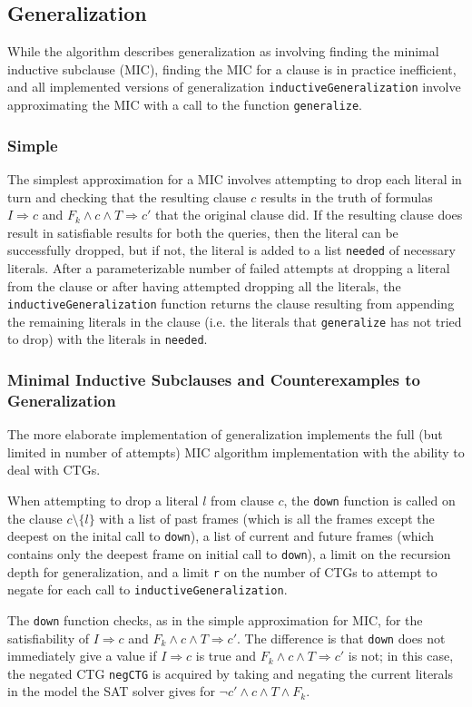 \documentclass[12pt,a4paper,twoside,openright]{report}
\begin{document}
{\subsection{Generalization}
While the algorithm describes generalization as involving finding the minimal inductive subclause (MIC),
finding the MIC for a clause is in practice inefficient, and all implemented versions of generalization
\verb,inductiveGeneralization, involve approximating the MIC with a call to the function
\verb,generalize,.

\subsubsection{Simple}
The simplest approximation for a MIC involves attempting to drop each literal in turn and checking
that the resulting clause $c$ results in the truth of formulas $I \Rightarrow c$ and
$F_k \wedge c \wedge T \Rightarrow c'$ that the original clause did. If the resulting clause
does result in satisfiable results for both the queries, then the literal can be successfully dropped,
but if not, the literal is added to a list \verb,needed, of necessary literals.
After a parameterizable number of failed attempts at dropping a literal from the clause or after
having attempted dropping all the literals, the
\verb,inductiveGeneralization, function returns the clause resulting from appending the remaining
literals in the clause (i.e. the literals that \verb,generalize, has not tried to drop)
with the literals in \verb,needed,.

\subsubsection{Minimal Inductive Subclauses and Counterexamples to Generalization}
The more elaborate implementation of generalization implements the full
(but limited in number of attempts) MIC algorithm implementation with the ability to deal with CTGs.

When attempting to drop a literal $l$ from clause $c$, the \verb,down, function is called on the clause
$c \setminus \{l\}$ with a list of past frames (which is all the frames except the deepest on the inital call
to \verb,down,), a list of current and future frames (which contains only the deepest frame on initial call
to \verb,down,), a limit on the recursion depth for generalization, and a limit \verb,r, on the number
of CTGs to attempt to negate for each call to \verb,inductiveGeneralization,.

The \verb,down, function checks, as in the simple approximation for MIC, for the satisfiability of
$I \Rightarrow c$ and $F_k \wedge c \wedge T \Rightarrow c'$. The difference is that \verb,down,
does not immediately give a value if $I \Rightarrow c$ is true and $F_k \wedge c \wedge T \Rightarrow c'$ is
not; in this case, the negated CTG \verb,negCTG, is acquired by taking and negating the current literals in
the model the SAT solver gives for $\neg c' \wedge c \wedge T \wedge F_k$.

}
\end{document}
